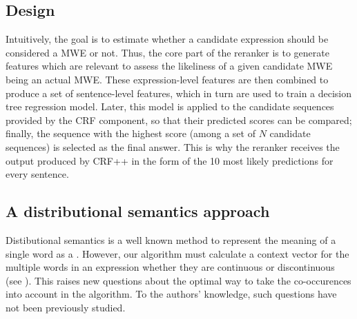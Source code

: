 \documentclass[output=paper,modfonts,nonflat]{langsci/langscibook}
\begin{document}
\subsection{Design}

Intuitively, the goal is to estimate whether a candidate expression
should be considered a MWE or not. Thus, the core part of the reranker
is to generate features which are relevant to assess the likeliness of
a given candidate MWE being an actual MWE. These expression-level
features are then combined to produce a set of sentence-level
features, which in turn are used to train a decision tree regression
model. Later, this model is applied to the candidate sequences
provided by the CRF component, so that their predicted scores can be
compared; finally, the sequence with the highest score (among a set of
$N$ candidate sequences) is selected as the final answer. This is why
the reranker receives the output produced by CRF++ in the form of the
10 most likely predictions for every sentence.




\subsection{A distributional semantics approach}
\label{subsec:semanticsApproach}

Distibutional semantics is a well known method to represent the
meaning of a single word as a 
\citep{schutze1998}. However, our algorithm must calculate a context
vector for the multiple words in an expression whether they are
continuous or discontinuous (see ).  This
raises new questions about the optimal way to take the co-occurences into
 account in the algorithm. To the authors’ knowledge, such
questions have not been previously studied.
\end{document}
